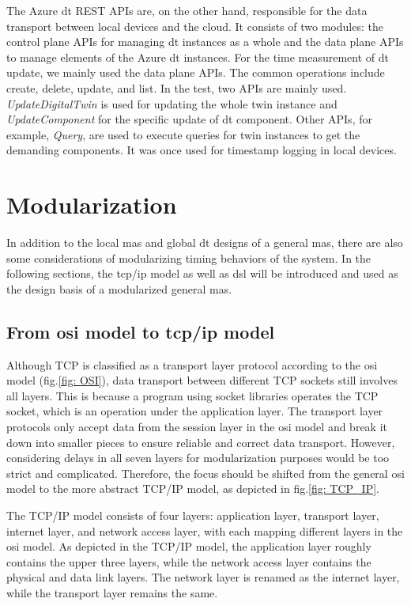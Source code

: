 The Azure \gls{dt} REST APIs are, on the other hand, responsible for the data 
transport between local devices and the cloud. It consists of two modules: the 
control plane APIs for managing \gls{dt} instances as a whole and the 
data plane APIs to manage elements of the Azure \gls{dt} instances. For the 
time measurement of \gls{dt} update, we mainly used the data plane APIs. The 
common operations include create, delete, update, and list. In the test, two 
APIs are mainly used. \textit{UpdateDigitalTwin} is used for updating 
the whole twin instance 
and \textit{UpdateComponent} for the specific update of \gls{dt} component. 
Other APIs, for example, \textit{Query}, are used to execute queries for twin 
instances to get the demanding components. It was once used for timestamp 
logging in local devices. 


\section{Modularization}\label{chap: Meth-Modular}
In addition to the local \gls{mas} and global \gls{dt} designs of a general \gls{mas}, 
there are also some considerations of modularizing timing behaviors of the 
system. In the following sections, the \gls{tcp/ip} model as well as 
\gls{dsl} will be introduced and used as the design basis of a modularized general 
\gls{mas}. 
\subsection{From \gls{osi} model to \gls{tcp/ip} model}

Although TCP is classified as a transport layer protocol according to the 
\gls{osi} model (fig.\ref{fig: OSI}), data transport between different TCP sockets 
still involves all layers. This is because a program using socket libraries 
operates the TCP socket, which is an operation under the application layer. 
The transport layer protocols only accept data from the session layer in the 
\gls{osi} model and break it down into smaller pieces to ensure reliable and correct 
data transport. However, considering delays in all seven layers for modularization 
purposes would be too strict and complicated. Therefore, the focus should be 
shifted from the general \gls{osi} model to the more abstract TCP/IP model, as depicted 
in fig.\ref{fig: TCP_IP}.

The TCP/IP model consists of four layers: application layer, transport layer, 
internet layer, and network access layer, with each mapping different layers in 
the \gls{osi} model. As depicted in the TCP/IP model, the application layer roughly 
contains the upper three layers, while the network access layer contains the 
physical and data link layers. The network layer is renamed as the internet 
layer, while the transport layer remains the same.

